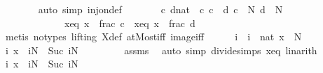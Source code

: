 \begin{isabellebody}
\ \ \ \ \ \ \isamarkupfalse%
\ {\isacharparenleft}{\kern0pt}auto\ simp{\isacharcolon}{\kern0pt}\ inj{\isacharunderscore}{\kern0pt}on{\isacharunderscore}{\kern0pt}def{\isacharparenright}{\kern0pt}\isanewline
\ \ \ \ \isamarkupfalse%
\ \isamarkupfalse%
\ c\ d{\isacharcolon}{\kern0pt}{\isacharcolon}{\kern0pt}nat\ \ c{\isacharcolon}{\kern0pt}\ {\isachardoublequoteopen}c\ {\isasymnoteq}\ d{\isachardoublequoteclose}\ {\isachardoublequoteopen}c\ {\isasymle}\ N{\isachardoublequoteclose}\ {\isachardoublequoteopen}d\ {\isasymle}\ N{\isachardoublequoteclose}\ \isanewline
\ \ \ \ \ \ \ \ \ \ \ \ \ xeq{\isacharcolon}{\kern0pt}\ {\isachardoublequoteopen}x\ {\isacharequal}{\kern0pt}\ frac\ {\isacharparenleft}{\kern0pt}c{\isacharasterisk}{\kern0pt}{\isasymtheta}{\isacharparenright}{\kern0pt}{\isachardoublequoteclose}\ \ xeq{\isacharprime}{\kern0pt}{\isacharcolon}{\kern0pt}\ {\isachardoublequoteopen}x{\isacharprime}{\kern0pt}\ {\isacharequal}{\kern0pt}\ frac\ {\isacharparenleft}{\kern0pt}d{\isacharasterisk}{\kern0pt}{\isasymtheta}{\isacharparenright}{\kern0pt}{\isachardoublequoteclose}\isanewline
\ \ \ \ \ \ \isamarkupfalse%
\ {\isacharparenleft}{\kern0pt}metis\ {\isacharparenleft}{\kern0pt}no{\isacharunderscore}{\kern0pt}types{\isacharcomma}{\kern0pt}\ lifting{\isacharparenright}{\kern0pt}\ X{\isacharunderscore}{\kern0pt}def\ atMost{\isacharunderscore}{\kern0pt}iff\ image{\isacharunderscore}{\kern0pt}iff{\isacharparenright}{\kern0pt}\isanewline
\ \ \ \ \isamarkupfalse%
\ i\ \ {\isachardoublequoteopen}i\ {\isasymequiv}\ nat\ {\isasymlfloor}x\ {\isacharasterisk}{\kern0pt}\ N{\isasymrfloor}{\isachardoublequoteclose}\isanewline
\ \ \ \ \isamarkupfalse%
\ \isamarkupfalse%
\ i{\isacharcolon}{\kern0pt}\ {\isachardoublequoteopen}x\ {\isasymin}\ {\isacharbraceleft}{\kern0pt}i{\isacharslash}{\kern0pt}N\ {\isachardot}{\kern0pt}{\isachardot}{\kern0pt}{\isacharless}{\kern0pt}\ Suc\ i{\isacharslash}{\kern0pt}N{\isacharbraceright}{\kern0pt}{\isachardoublequoteclose}\ \isanewline
\ \ \ \ \ \ \isamarkupfalse%
\ assms\ \isamarkupfalse%
\ {\isacharparenleft}{\kern0pt}auto\ simp{\isacharcolon}{\kern0pt}\ divide{\isacharunderscore}{\kern0pt}simps\ xeq{\isacharparenright}{\kern0pt}\ linarith\isanewline
\ \ \ \ \isamarkupfalse%
\ i{\isacharprime}{\kern0pt}{\isacharcolon}{\kern0pt}\ {\isachardoublequoteopen}x{\isacharprime}{\kern0pt}\ {\isasymin}\ {\isacharbraceleft}{\kern0pt}i{\isacharslash}{\kern0pt}N\ {\isachardot}{\kern0pt}{\isachardot}{\kern0pt}{\isacharless}{\kern0pt}\ Suc\ i{\isacharslash}{\kern0pt}N{\isacharbraceright}{\kern0pt}{\isachardoublequoteclose}\ \isanewline

\end{isabellebody}
